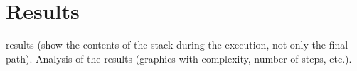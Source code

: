 \section{Results}
\label{sec:results}
 results (show the contents of the stack during the execution, not only
the final path). Analysis of the results (graphics with complexity, number of steps, etc.).